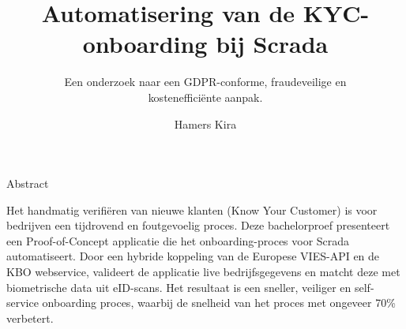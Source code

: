 \documentclass[a0,portrait]{hogent-poster}
\title{Automatisering van de KYC-onboarding bij Scrada}
\subtitle{Een onderzoek naar een GDPR-conforme, fraudeveilige en \\ kostenefficiënte aanpak.}
\author{Hamers Kira}
\begin{document}
\begin{minipage}[c]{\linewidth}
    \maketitle
\end{minipage}%

\begin{center}
    \vspace{-0.5cm}
    \vspace{0.3cm}
    {\huge\titlefont\color{hogent-blue} Abstract} \\
    \vspace{0.3cm}
    \begin{minipage}{0.95\linewidth}
        \Large
        Het handmatig verifiëren van nieuwe klanten (Know Your Customer) is voor bedrijven een tijdrovend en foutgevoelig proces. 
        Deze bachelorproef presenteert een Proof-of-Concept applicatie die het onboarding-proces voor Scrada automatiseert. 
        Door een hybride koppeling van de Europese VIES-API en de KBO webservice, valideert de applicatie live bedrijfsgegevens en matcht deze met biometrische data uit eID-scans. 
        Het resultaat is een sneller, veiliger en self-service onboarding proces, waarbij de snelheid van het proces met ongeveer 70\% verbetert.
    \end{minipage}
    \vspace{0.3cm}
\end{center}
\end{document}

